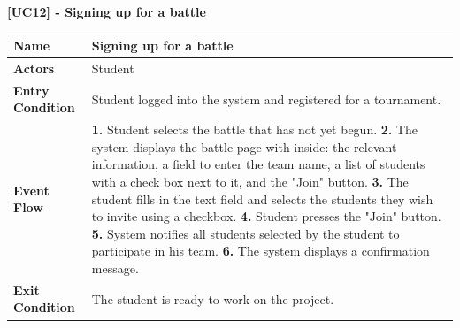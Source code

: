 \clearpage
\raggedright
\textbf{[UC12] - Signing up for a battle}
\begin{table}[h]
\begin{tabular}{|l|p{12cm}|} \hline 

\rule[-3mm]{0mm}{1cm}
\textbf{Name} & Signing up for a battle \\ \hline 

\rule[-3mm]{0mm}{1cm}
\textbf{Actors} & Student \\ \hline 

\rule[-3mm]{0mm}{1cm}
\textbf{Entry Condition} & Student logged into the system and registered for a tournament.
\vspace{2pt}
\\ \hline 

\rule[-3mm]{0mm}{1cm}
\textbf{Event Flow} & 
\textbf{1.} Student selects the battle that has not yet begun.
\vspace{4pt}
\newline
\textbf{2.} The system displays the battle page with inside: 
the relevant information, a field to enter the team name, a list of students with a check box next to it, and the "Join" button.
\vspace{4pt}
\newline
\textbf{3.} The student fills in the text field and selects the students they wish to invite using a checkbox.
\vspace{4pt}
\newline
\textbf{4.} Student presses the "Join" button.
\vspace{4pt}
\newline
\textbf{5.} System notifies all students selected by the student to participate in his team.
\vspace{4pt}
\newline
\textbf{6.} The system displays a confirmation message.

\vspace{4pt}

\\ \hline 

\rule[-3mm]{0mm}{1cm}
\textbf{Exit Condition} & The student is ready to work on the project. \\ \hline

\end{tabular}
\end{table}


